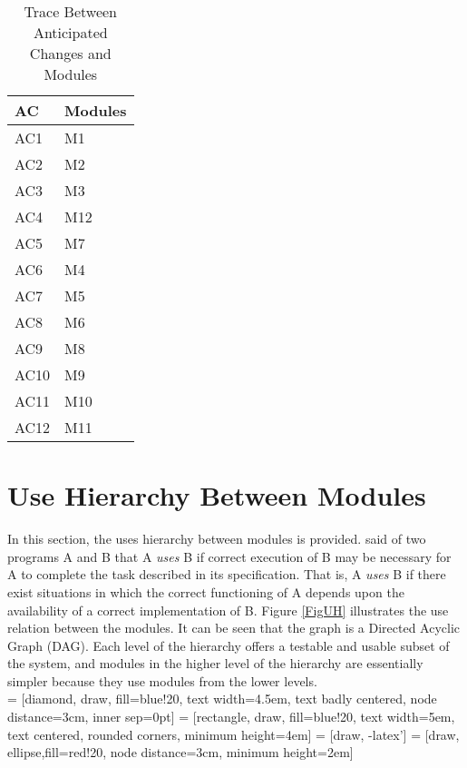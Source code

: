 \documentclass[12pt, titlepage]{article}
\begin{document}
	\begin{table}[H]
		\centering
		\begin{tabular}{p{} p{}}
			\toprule
			\textbf{AC} & \textbf{Modules}\\
			\midrule
			AC1 & M1\\
			AC2 & M2\\
			AC3 & M3\\
			AC4 & M12\\
			AC5 & M7\\ 
			AC6 & M4\\ 
			AC7 & M5\\ 
			AC8 & M6\\ 
			AC9 & M8\\ 
			AC10 & M9\\
			AC11 & M10\\ 
			AC12 & M11\\
			\bottomrule
		\end{tabular}
		\caption{Trace Between Anticipated Changes and Modules}
		\label{TblACT}
	\end{table}
	
	\section{Use Hierarchy Between Modules} \label{SecUse}
	
	In this section, the uses hierarchy between modules is
	provided. \citet{Parnas1978} said of two programs A and B that A {\em uses} 
	B if
	correct execution of B may be necessary for A to complete the task 
	described in
	its specification. That is, A {\em uses} B if there exist situations in 
	which
	the correct functioning of A depends upon the availability of a correct
	implementation of B.  Figure \ref{FigUH} illustrates the use relation 
	between
	the modules. It can be seen that the graph is a Directed Acyclic Graph
	(DAG). Each level of the hierarchy offers a testable and usable subset of 
	the
	system, and modules in the higher level of the hierarchy are essentially 
	simpler
	because they use modules from the lower levels. \\
	
	
	
	 = [diamond, draw, fill=blue!20, 
	text width=4.5em, text badly centered, node distance=3cm, inner sep=0pt]
	 = [rectangle, draw, fill=blue!20, 
	text width=5em, text centered, rounded corners, minimum height=4em]
	 = [draw, -latex']
	 = [draw, ellipse,fill=red!20, node distance=3cm,
	minimum height=2em] 
	
\end{document}
